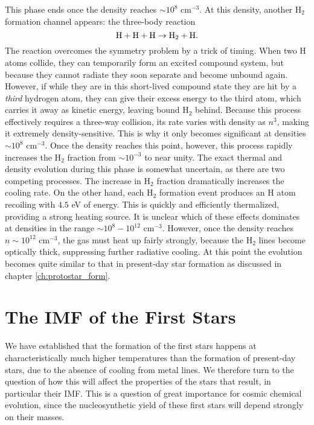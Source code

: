 This phase ends once the density reaches $\sim 10^8$ cm$^{-3}$. At this density, another H$_2$ formation channel appears: the three-body reaction
\begin{equation}
{\rm H} + {\rm H} + {\rm H} \rightarrow {\rm H}_2 + {\rm H}.
\end{equation}
The reaction overcomes the symmetry problem by a trick of timing. When two H atoms collide, they can temporarily form an excited compound system, but because they cannot radiate they soon separate and become unbound again. However, if while they are in this short-lived compound state they are hit by a \textit{third} hydrogen atom, they can give their excess energy to the third atom, which carries it away as kinetic energy, leaving bound H$_2$ behind. Because this process effectively requires a three-way collision, its rate varies with density as $n^3$, making it extremely density-sensitive. This is why it only becomes significant at densities $\sim 10^8$ cm$^{-3}$. Once the density reaches this point, however, this process rapidly increases the H$_2$ fraction from $\sim 10^{-3}$ to near unity. The exact thermal and density evolution during this phase is somewhat uncertain, as there are two competing processes. The increase in H$_2$ fraction dramatically increases the cooling rate. On the other hand, each H$_2$ formation event produces an H atom recoiling with $4.5$ eV of energy. This is quickly and efficiently thermalized, providing a strong heating source. It is unclear which of these effects dominates at densities in the range $\sim 10^8-10^{12}$ cm$^{-3}$. However, once the density reaches $n\sim 10^{12}$ cm$^{-3}$, the gas must heat up fairly strongly, because the H$_2$ lines become optically thick, suppressing further radiative cooling. At this point the evolution becomes quite similar to that in present-day star formation as discussed in chapter \ref{ch:protostar_form}.


\section{The IMF of the First Stars}

We have established that the formation of the first stars happens at characteristically much higher temperatures than the formation of present-day stars, due to the absence of cooling from metal lines. We therefore turn to the question of how this will affect the properties of the stars that result, in particular their IMF. This is a question of great importance for cosmic chemical evolution, since the nucleosynthetic yield of these first stars will depend strongly on their masses.

